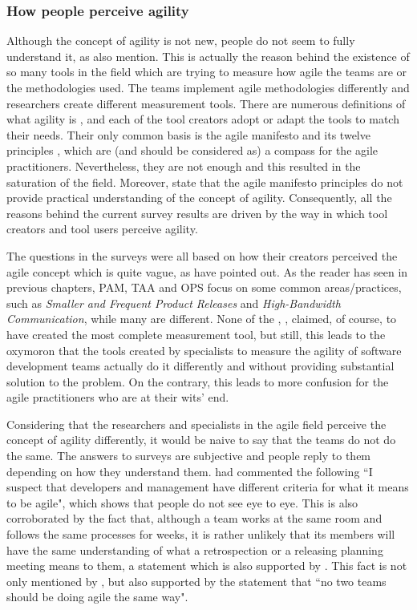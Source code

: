 \subsubsection{How people perceive agility}
Although the concept of agility is not new, people do not seem to fully understand it, as \citet{Wang_Conboy} also mention. This is actually the reason behind the existence of so many tools in the field which are trying to measure how agile the teams are or the methodologies used. The teams implement agile methodologies differently and researchers create different measurement tools. There are numerous definitions of what agility is \cite{Kidd, Kara, Ramesh, agile_manufacturing}, and each of the tool creators adopt or adapt the tools to match their needs. Their only common basis is the agile manifesto \cite{beck2001agile} and its twelve principles \cite{agile_principles}, which are (and should be considered as) a compass for the agile practitioners. Nevertheless, they are not enough and this resulted in the saturation of the field. Moreover, \citet{conboy_fitzgerald} state that the agile manifesto principles do not provide practical understanding of the concept of agility. Consequently, all the reasons behind the current survey results are driven by the way in which tool creators and tool users perceive agility.

The questions in the surveys were all based on how their creators perceived the agile concept which is quite vague, as \citet{tsourveloudis} have pointed out. As the reader has seen in previous chapters, \ac{PAM}, \ac{TAA} and \ac{OPS} focus on some common areas/practices, such as  \textit{Smaller and Frequent Product Releases} and \textit{High-Bandwidth Communication}, while many are different. None of the \citet{sventha_dissertation}, \citet{pam}, \citet{Leffingwell} claimed, of course, to have created the most complete measurement tool, but still, this leads to the oxymoron that the tools created by specialists to measure the agility of software development teams actually do it differently and without providing substantial solution to the problem. On the contrary, this leads to more confusion for the agile practitioners who are at their wits' end.

Considering that the researchers and specialists in the agile field perceive the concept of agility differently, it would be naive to say that the teams do not do the same. The answers to surveys are subjective and people reply to them depending on how they understand them. \citet{ambler} had commented the following ``I suspect that developers and management have different criteria for what it means to be agile", which shows that people do not see eye to eye. This is also corroborated by the fact that, although a team works at the same room and follows the same processes for weeks, it is rather unlikely that its members will have the same understanding of what a retrospection or a releasing planning meeting means to them, a statement which is also supported by \citet{Williams_Microsoft}. This fact is not only mentioned by \citet{Dave_Thomas}, but also supported by the statement that ``no two teams should be doing agile the same way".

